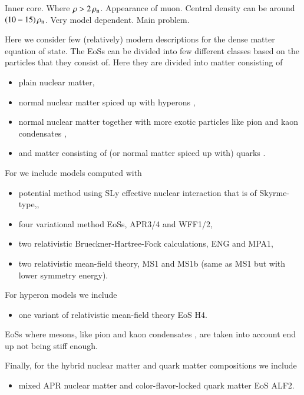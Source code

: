Inner core.
Where $\rho > 2\, \rho_{\mathrm{n}} $.
Appearance of muon.
Central density can be around $(10-15)\, \rho_{\mathrm{n}} $.
Very model dependent.
Main problem.

Here we consider few (relatively) modern descriptions for the dense matter equation of state.
The EoSs can be divided into few different classes based on the particles that they consist of.
Here they are divided into matter consisting of
\begin{itemize}
    \item plain \npem nuclear matter, 
    \item normal nuclear matter spiced up with hyperons \hyperon,
    \item normal nuclear matter together with more exotic particles like pion and kaon condensates \pikaon,
    \item and matter consisting of (or normal matter spiced up with) quarks \quark.
\end{itemize}

For \npem we include models computed with
\begin{itemize}
    \item potential method using SLy effective nuclear interaction that is of Skyrme-type,\cite{SLy},
    \item four variational method EoSs, APR3/4\cite{APR} and WFF1/2\cite{WFF},
    \item two relativistic Brueckner-Hartree-Fock calculations, ENG\cite{ENG} and MPA1\cite{MPA},
    \item two relativistic mean-field theory, MS1 and MS1b (same as MS1 but with lower symmetry energy)\cite{MS}.
\end{itemize}

For hyperon models \hyperon we include
\begin{itemize}
    \item one variant of relativistic mean-field theory EoS H4\cite{H4}.
\end{itemize}

EoSs where mesons, like pion and kaon condensates \pikaon, are taken into account end up not being stiff enough.

Finally, for the hybrid nuclear matter and quark matter compositions \quark we include 
\begin{itemize}
    \item mixed APR nuclear matter and color-flavor-locked quark matter EoS ALF2.\cite{ALF}
\end{itemize}



